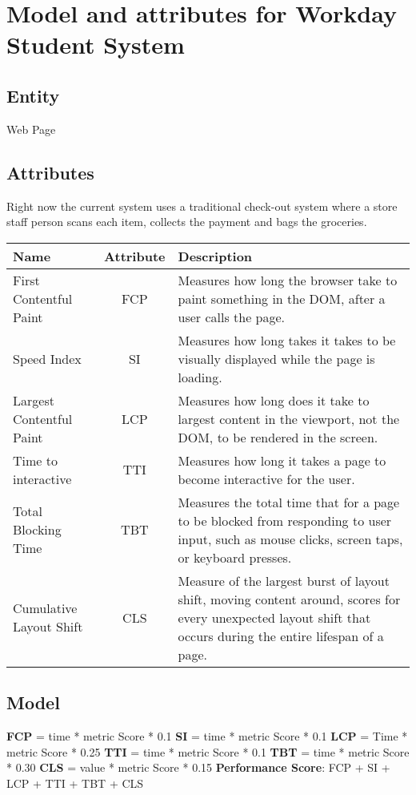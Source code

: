 \section{Model and attributes for Workday Student System}

\subsection{Entity}
Web Page

\subsection{Attributes}
Right now the current system uses a traditional check-out system where a store 
staff person scans each item, collects the payment 
and bags the groceries. \newline
\begin{center}
    \begin{tabular}{|l c p{7cm}|} 
        \hline
        Name & Attribute & Description \\ [0.5ex] 
        \hline
        First Contentful Paint & FCP & Measures how long the browser take to paint something in the DOM, after a user calls the page.\\ 
        \hline
        Speed Index & SI & Measures how long takes it takes to be visually displayed while the page is loading.\\
        \hline
        Largest Contentful Paint & LCP & Measures how long does it take to largest content in the viewport, not the DOM, to be rendered in the screen.\\
        \hline
        Time to interactive & TTI & Measures how long it takes a page to become interactive for the user. \\
        \hline
        Total Blocking Time & TBT & Measures the total time that  for a page to be blocked from responding to user input, such as mouse clicks, screen taps, or keyboard presses. \\ 
        \hline
        Cumulative Layout Shift & CLS &
        Measure of the largest burst of layout shift, moving content around, scores for every unexpected layout shift that occurs during the entire lifespan of a page. \\ 
        \hline
    \end{tabular}
\end{center}
\pagebreak
\subsection{Model}
\textbf{FCP} = time * metric Score * 0.1 \newline
\textbf{SI} = time * metric Score * 0.1 \newline
\textbf{LCP} = Time * metric Score * 0.25 \newline
\textbf{TTI} = time * metric Score * 0.1 \newline
\textbf{TBT} = time * metric Score * 0.30 \newline
\textbf{CLS} = value * metric Score * 0.15\newline\newline
\textbf{Performance Score}: FCP + SI + LCP + TTI + TBT + CLS

